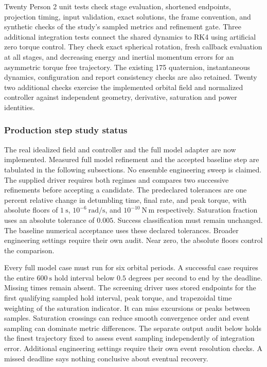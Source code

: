 Twenty Person 2 unit tests check stage evaluation, shortened endpoints,
projection timing, input validation, exact solutions, the frame convention,
and synthetic checks of the study's sampled metrics and refinement gate.
Three additional integration tests connect the shared dynamics to RK4 using
artificial zero torque control. They check exact spherical rotation, fresh
callback evaluation at all stages, and decreasing energy and inertial momentum
errors for an asymmetric torque free trajectory. The existing 175 quaternion, instantaneous dynamics, configuration
and report consistency checks are also retained. Twenty two additional checks exercise the implemented orbital field and normalized
controller against independent geometry, derivative, saturation and power identities.

\subsubsection{Production step study status}
The real idealized field and controller and the full model adapter are now implemented.
Measured full model refinement and the accepted baseline step are tabulated in the following
subsections. No ensemble engineering sweep is claimed. The supplied driver requires
both regimes and compares two successive refinements before accepting a
candidate. The predeclared tolerances are one percent relative change in detumbling
time, final rate, and peak torque, with absolute floors of $1\ \mathrm{s}$,
$10^{-6}\ \mathrm{rad/s}$, and $10^{-10}\ \mathrm{N\,m}$ respectively.
Saturation fraction uses an absolute tolerance of $0.005$. Success
classification must remain unchanged. The baseline numerical acceptance uses these declared tolerances. Broader engineering settings require their own audit. Near zero, the absolute floors control the comparison.

Every full model case must run for six orbital periods. A successful case
requires the entire $600\ \mathrm{s}$ hold interval below $0.5$ degrees per
second to end by the deadline. Missing times remain absent. The screening
driver uses stored endpoints for the first qualifying sampled hold interval,
peak torque, and trapezoidal time weighting of the saturation indicator.
It can miss excursions or peaks between samples. Saturation crossings can
reduce smooth convergence order and event sampling can dominate metric
differences. The separate output audit below holds the finest trajectory fixed to assess event sampling independently of integration error. Additional engineering settings require their own event resolution checks. A missed deadline says
nothing conclusive about eventual recovery.
